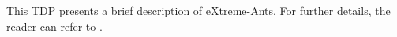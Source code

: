 This TDP presents a brief description of eXtreme-Ants. For further details, the reader can refer to \cite{Santos&Bazzan2009optmas}.


%


%
%

